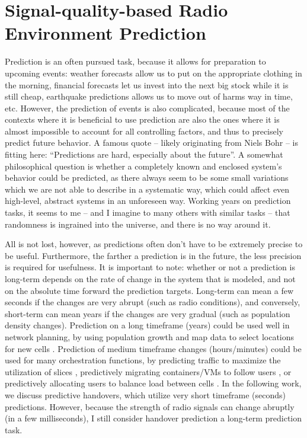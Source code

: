 \chapter{Signal-quality-based Radio Environment Prediction}
	\label{cha:pred_ho}
	
	Prediction is an often pursued task, because it allows for preparation to upcoming events: weather forecasts allow us to put on the appropriate clothing in the morning, financial forecasts let us invest into the next big stock while it is still cheap, earthquake predictions allows us to move out of harms way in time, etc.
	However, the prediction of events is also complicated, because most of the contexts where it is beneficial to use prediction are also the ones where it is almost impossible to account for all controlling factors, and thus to precisely predict future behavior.
	A famous quote -- likely originating from Niels Bohr -- is fitting here: ``Predictions are hard, especially about the future''.
	A somewhat philosophical question is whether a completely known and enclosed system's behavior could be predicted, as there always seem to be some small variations which we are not able to describe in a systematic way, which could affect even high-level, abstract systems in an unforeseen way.
	Working years on prediction tasks, it seems to me -- and I imagine to many others with similar tasks -- that randomness is ingrained into the universe, and there is no way around it.
	
	All is not lost, however, as predictions often don't have to be extremely precise to be useful.
	Furthermore, the farther a prediction is in the future, the less precision is required for usefulness.
	It is important to note: whether or not a prediction is long-term depends on the rate of change in the system that is modeled, and not on the absolute time forward the prediction targets.
	Long-term can mean a few seconds if the changes are very abrupt (such as radio conditions), and conversely, short-term can mean years if the changes are very gradual (such as population density changes).
	Prediction on a long timeframe (years) could be used well in network planning, by using population growth and map data to select locations for new cells \cite{pred_network_planning}.  
	Prediction of medium timeframe changes (hours/minutes) could be used for many orchestration functions, by predicting traffic to maximize the utilization of slices \cite{pred_slicing}, predictively migrating containers/\acp{VM} to follow users \cite{pred_resource_alloc}, or predictively allocating users to balance load between cells \cite{pred_load_balance}.
	In the following work, we discuss predictive handovers, which utilize very short timeframe (seconds) predictions.
	However, because the strength of radio signals can change abruptly (in a few milliseconds), I still consider handover prediction a long-term prediction task.

